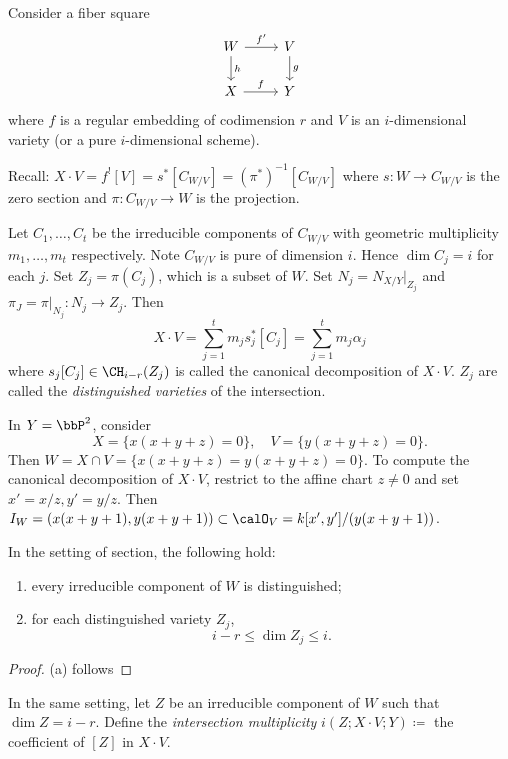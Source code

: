   Consider a fiber square
  \[
    \begin{tikzcd}
      W \arrow[r, "f'"] \arrow[d, "h"] & V \arrow[d, "g"] \\
      X \arrow[r, "f"] & Y
    \end{tikzcd}
  \]
  where $f$ is a regular embedding of codimension $r$ and $V$ is an $i$-dimensional variety (or a pure $i$-dimensional scheme).
  
  Recall: $X \cdot V = f^! [V] = s^*[C_{W/V}] = (\pi^*)^{-1} [C_{W/V}]$ where $s: W \to C_{W/V}$ is the zero section and $\pi: C_{W/V} \to W$ is the projection.

  Let $C_1, \dots, C_t$ be the irreducible components of $C_{W/V}$ with geometric multiplicity $m_1, \dots, m_t$ respectively.
  Note $C_{W/V}$ is  pure of dimension $i$.
  Hence $\dim C_j = i$ for each $j$.
  Set $Z_j = \pi(C_j)$, which is a subset of $W$.
  Set $N_j = N_{X/Y}|_{Z_j}$ and $\pi_J = \pi|_{N_j}: N_j \to Z_j$.
  \Yang{}
  Then 
  \[ X \cdot V = \sum_{j=1}^t m_j s_j^* [C_j] = \sum_{j=1}^t m_j \alpha_j \]
  where $s_j[C_j] \in \CH_{i-r}(Z_j)$ is called the canonical decomposition of $X \cdot V$.
  $Z_j$ are called the \emph{distinguished varieties} of the intersection.

  \begin{example}
    In $Y = \bbP^2$, consider
    \[ X = \{x(x+y+z) = 0\}, \quad V = \{y(x+y+z) = 0\}. \]
    Then $W = X \cap V = \{x(x+y+z) = y(x+y+z) = 0\}$.
    To compute the canonical decomposition of $X \cdot V$, restrict to the affine chart $z \neq 0$ and set $x' = x/z, y' = y/z$.
    Then $I_W = (x(x+y+1), y(x+y+1)) \subset \calO_V = k[x', y']/(y(x+y+1))$.
    \Yang{}
  \end{example}

  \begin{lemma}
    In the setting of section, the following hold:
    \begin{enumerate}
      \item every irreducible component of $W$ is distinguished;
      \item for each distinguished variety $Z_j$, 
        \[ i-r \leq \dim Z_j \leq i. \]
    \end{enumerate}
  \end{lemma}
  \begin{proof}
    (a) follows 

    \Yang{}
  \end{proof}

  \begin{definition}
    In the same setting, let $Z$ be an irreducible component of $W$ such that $\dim Z = i-r$.
    Define the \emph{intersection multiplicity} $i(Z; X \cdot V;Y) \coloneqq $ the coefficient of $[Z]$ in $X \cdot V$.
    \Yang{}
  \end{definition}

